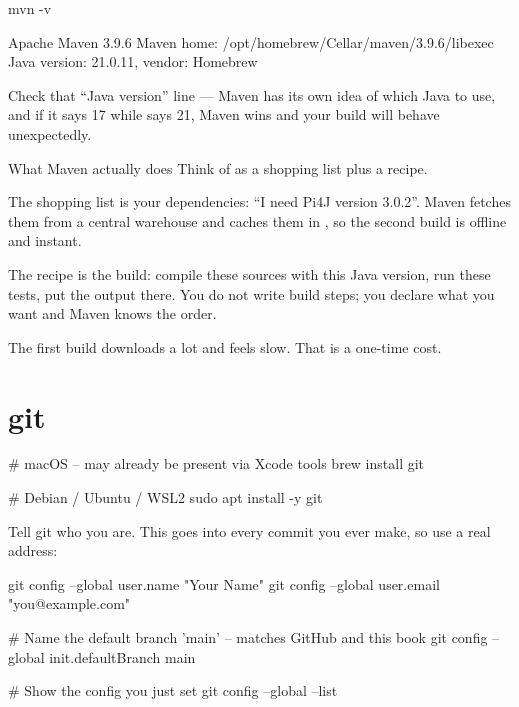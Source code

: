 \begin{shell}
mvn -v
\end{shell}

\begin{trace}
Apache Maven 3.9.6
Maven home: /opt/homebrew/Cellar/maven/3.9.6/libexec
Java version: 21.0.11, vendor: Homebrew
\end{trace}

Check that ``Java version'' line --- Maven has its own idea of which Java to use,
and if it says 17 while  says 21, Maven wins and your build
will behave unexpectedly.

\begin{analogy}{What Maven actually does}
Think of  as a shopping list plus a recipe.

The shopping list is your dependencies: ``I need Pi4J version 3.0.2''. Maven
fetches them from a central warehouse and caches them in
, so the second build is offline and instant.

The recipe is the build: compile these sources with this Java version, run these
tests, put the output there. You do not write build steps; you declare what you
want and Maven knows the order.

The first build downloads a lot and feels slow. That is a one-time cost.
\end{analogy}

\section{git}

\begin{shell}
# macOS -- may already be present via Xcode tools
brew install git

# Debian / Ubuntu / WSL2
sudo apt install -y git
\end{shell}

Tell git who you are. This goes into every commit you ever make, so use a real
address:

\begin{shell}
git config --global user.name  "Your Name"
git config --global user.email "you@example.com"

# Name the default branch 'main' -- matches GitHub and this book
git config --global init.defaultBranch main

# Show the config you just set
git config --global --list
\end{shell}

